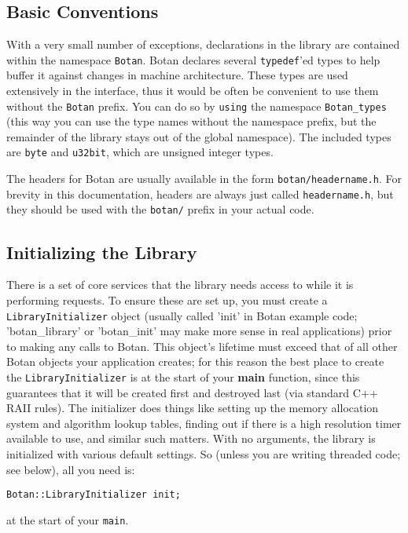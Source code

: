 \documentclass{article}
\newcommand{\filename}[1]{\texttt{#1}}
\newcommand{\function}[1]{\textbf{#1}}
\newcommand{\keyword}[1]{\texttt{#1}}
\newcommand{\type}[1]{\texttt{#1}}
\newcommand{\namespace}[1]{\texttt{#1}}
\begin{document}
\subsection{Basic Conventions}

With a very small number of exceptions, declarations in the library
are contained within the namespace \namespace{Botan}. Botan declares
several \keyword{typedef}'ed types to help buffer it against changes
in machine architecture.  These types are used extensively in the
interface, thus it would be often be convenient to use them without
the \namespace{Botan} prefix. You can do so by \keyword{using} the
namespace \namespace{Botan\_types} (this way you can use the type
names without the namespace prefix, but the remainder of the library
stays out of the global namespace). The included types are \type{byte}
and \type{u32bit}, which are unsigned integer types.

The headers for Botan are usually available in the form
\filename{botan/headername.h}. For brevity in this documentation,
headers are always just called \filename{headername.h}, but they
should be used with the \filename{botan/} prefix in your actual code.

\subsection{Initializing the Library}

There is a set of core services that the library needs access to while
it is performing requests. To ensure these are set up, you must create
a \type{LibraryInitializer} object (usually called 'init' in Botan
example code; 'botan\_library' or 'botan\_init' may make more sense in
real applications) prior to making any calls to Botan. This object's
lifetime must exceed that of all other Botan objects your application
creates; for this reason the best place to create the
\type{LibraryInitializer} is at the start of your \function{main}
function, since this guarantees that it will be created first and
destroyed last (via standard C++ RAII rules). The initializer does
things like setting up the memory allocation system and algorithm
lookup tables, finding out if there is a high resolution timer
available to use, and similar such matters. With no arguments, the
library is initialized with various default settings. So (unless you
are writing threaded code; see below), all you need is:

\texttt{Botan::LibraryInitializer init;}

at the start of your \texttt{main}.
\end{document}
